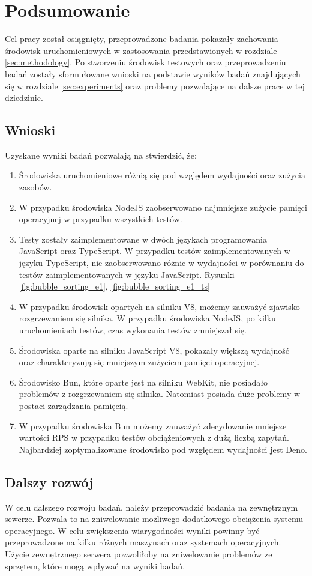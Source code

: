 \section{Podsumowanie}
Cel pracy został osiągnięty, przeprowadzone badania pokazały zachowania środowisk uruchomieniowych w zastosowania przedstawionych w rozdziale \ref{sec:methodology}. Po stworzeniu środowisk testowych oraz przeprowadzeniu badań zostały sformułowane wnioski na podstawie wyników badań znajdujących się w rozdziale \ref{sec:experiments} oraz problemy pozwalające na dalsze prace w tej dziedzinie.

\subsection{Wnioski}
Uzyskane wyniki badań pozwalają na stwierdzić, że:
\begin{enumerate}
  \item Środowiska uruchomieniowe różnią się pod względem wydajności oraz zużycia zasobów. 
  \item W przypadku środowiska NodeJS zaobserwowano najmniejsze zużycie pamięci operacyjnej w przypadku wszystkich testów.
  \item Testy zostały zaimplementowane w dwóch językach programowania JavaScript oraz TypeScript. W przypadku testów zaimplementowanych w języku TypeScript, nie zaobserwowano różnic w wydajności w porównaniu do testów zaimplementowanych w języku JavaScript. Rysunki \ref{fig:bubble_sorting_e1}, \ref{fig:bubble_sorting_e1_ts}
  \item W przypadku środowisk opartych na silniku V8, możemy zauważyć zjawisko rozgrzewaniem się silnika. W przypadku środowiska NodeJS, po kilku uruchomieniach testów, czas wykonania testów zmniejszał się.
  \item Środowiska oparte na silniku JavaScript V8, pokazały większą wydajność oraz charakteryzują się mniejszym zużyciem pamięci operacyjnej.
  \item Środowisko Bun, które oparte jest na silniku WebKit, nie posiadało problemów z rozgrzewaniem się silnika. Natomiast posiada duże problemy w postaci zarządzania pamięcią.
  \item W przypadku środowiska Bun możemy zauważyć zdecydowanie mniejsze wartości RPS w przypadku testów obciążeniowych z dużą liczbą zapytań. Najbardziej zoptymalizowane środowisko pod względem wydajności jest Deno.
\end{enumerate}

\subsection{Dalszy rozwój}
W celu dalszego rozwoju badań, należy przeprowadzić badania na zewnętrznym sewerze. Pozwala to na zniwelowanie możliwego dodatkowego obciążenia systemu operacyjnego. W celu zwiększenia wiarygodności wyniki powinny być przeprowadzone na kilku różnych maszynach oraz systemach operacyjnych. Użycie zewnętrznego serwera pozwoliłoby na zniwelowanie problemów ze sprzętem, które mogą wpływać na wyniki badań.

